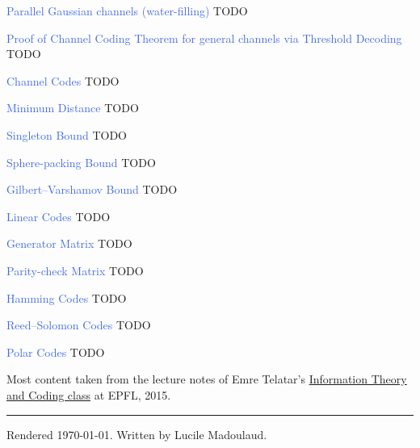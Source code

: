 \documentclass[10pt,a4paper,landscape]{article}
\newcommand{\concept}[1]{\textcolor{RoyalBlue}{#1}}
\renewcommand{\section}[1]{
    \vspace{-0.3cm}
    \begin{center}
      \color{Bittersweet}
      \hrulefill{\small~~#1~~}\hrulefill
    \end{center}
    \vspace{-0.3cm}
  }
\begin{document}
\begin{multicols*}{4}
\concept{Parallel Gaussian channels (water-filling)} TODO

\concept{Proof of Channel Coding Theorem for general channels via Threshold Decoding} TODO

\concept{Channel Codes} TODO
 
\concept{Minimum Distance} TODO
 
\concept{Singleton Bound} TODO
 
\concept{Sphere-packing Bound} TODO
 
\concept{Gilbert–Varshamov Bound} TODO

\concept{Linear Codes} TODO
 
\concept{Generator Matrix} TODO
 
\concept{Parity-check Matrix} TODO
 
\concept{Hamming Codes} TODO

\concept{Reed–Solomon Codes} TODO

\concept{Polar Codes} TODO

\ifdefined \longversion %
\else \newpage
\fi



\section{Credits}
Most content taken from the lecture notes of Emre Telatar's \href{http://ipg.epfl.ch/doku.php?id=en:courses:2015-2016:itc}{Information Theory and Coding class} at EPFL, 2015.

\vspace{0.5cm}
\hrule
\vspace{0.5cm}
\tiny
Rendered \today. Written by Lucile Madoulaud.

\end{multicols*}
\end{document}
